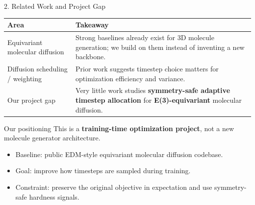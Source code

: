 \documentclass[aspectratio=169,11pt]{beamer}
\begin{document}
\begin{frame}{2. Related Work and Project Gap}
\small
\begin{table}
\centering
\begin{tabular}{p{}p{}}
\toprule
\textbf{Area} & \textbf{Takeaway} \\
\midrule
Equivariant molecular diffusion & Strong baselines already exist for 3D molecule generation; we build on them instead of inventing a new backbone. \\
Diffusion scheduling / weighting & Prior work suggests timestep choice matters for optimization efficiency and variance. \\
Our project gap & Very little work studies \textbf{symmetry-safe adaptive timestep allocation} for \textbf{E(3)-equivariant} molecular diffusion. \\
\bottomrule
\end{tabular}
\end{table}

\vspace{0.3em}
\begin{block}{Our positioning}
This is a \textbf{training-time optimization project}, not a new molecule generator architecture.
\end{block}

\begin{itemize}
    \item Baseline: public EDM-style equivariant molecular diffusion codebase.
    \item Goal: improve how timesteps are sampled during training.
    \item Constraint: preserve the original objective in expectation and use symmetry-safe hardness signals.
\end{itemize}
\end{frame}
\end{document}

